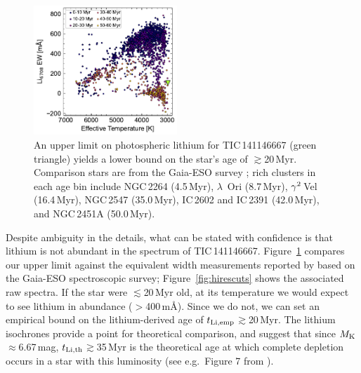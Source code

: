 \documentclass[11pt,twocolumn,tighten,linenumbers]{aastex7}
\begin{document}
\begin{figure}[!t]
  \centering
  \includegraphics[width=0.48\textwidth]{figures/sf2.pdf}
  \caption{An upper limit on photospheric lithium for TIC\,141146667
  (green triangle) yields a lower bound on the star's age of
  $\gtrsim$20\,Myr.  Comparison stars are from the Gaia-ESO survey
  \citep{Jeffries2023}; rich clusters in each age bin include NGC\,2264
  (4.5\,Myr), $\lambda$~Ori (8.7\,Myr), ${\rm \gamma}^2$\,Vel
  (16.4\,Myr), NGC\,2547 (35.0\,Myr), IC\,2602 and IC\,2391 (42.0\,Myr),
  and NGC\,2451A (50.0\,Myr). }
  \label{fig:liew_population}
\end{figure}

Despite ambiguity in the details, what can be stated with
confidence is that lithium is not abundant in the spectrum of
TIC\,141146667.  Figure~\ref{fig:liew_population}
compares our upper limit against the equivalent width measurements
reported by \citet{Jeffries2023} based on the Gaia-ESO spectroscopic
survey; Figure~\ref{fig:hirescuts} shows the associated
raw spectra.  If the star were $\lesssim$20\,Myr old, at its
temperature we would expect to see lithium in abundance
($>$400\,m\AA).  Since we do not, we can set an empirical bound on the
lithium-derived age of $t_{\rm Li,emp}$$\gtrsim$20\,Myr.  The
\citet{Feiden2016} lithium isochrones provide a point for theoretical
comparison, and suggest that since $M_{\rm K}$$\approx$6.67\,mag,
$t_{\rm Li,th}$$\gtrsim$35\,Myr is the theoretical age at which
complete depletion occurs in a star with this luminosity (see
e.g.~Figure 7 from \citealt{Wood2023}).
\end{document}
